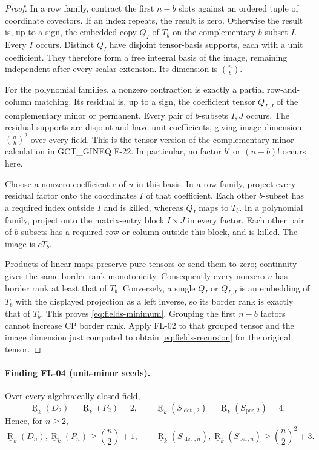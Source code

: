\begin{proof}
In a row family, contract the first $n-b$ slots against an ordered
tuple of coordinate covectors. If an index repeats, the result is
zero. Otherwise the result is, up to a sign, the embedded copy
$Q_I$ of $T_b$ on the complementary $b$-subset $I$. Every $I$
occurs. Distinct $Q_I$ have disjoint tensor-basis supports, each
with a unit coefficient. They therefore form a free integral basis
of the image, remaining independent after every scalar extension.
Its dimension is $\binom nb$.

For the polynomial families, a nonzero contraction is exactly a
partial row-and-column matching. Its residual is, up to a sign,
the coefficient tensor $Q_{I,J}$ of the complementary minor or
permanent. Every pair of $b$-subsets $I,J$ occurs. The residual
supports are disjoint and have unit coefficients, giving image
dimension $\binom nb^2$ over every field. This is the tensor version
of the complementary-minor calculation in GCT\_GINEQ F-22.
In particular, no factor $b!$ or $(n-b)!$ occurs here.

Choose a nonzero coefficient $c$ of $u$ in this basis. In a row
family, project every residual factor onto the coordinates $I$
of that coefficient. Each other $b$-subset has a required index
outside $I$ and is killed, whereas $Q_I$ maps to $T_b$.
In a polynomial family, project onto the matrix-entry block
$I\times J$ in every factor. Each other pair of $b$-subsets has
a required row or column outside this block, and is killed.
The image is $cT_b$.

Products of linear maps preserve pure tensors or send them to
zero; continuity gives the same border-rank monotonicity.
Consequently every nonzero $u$ has border rank at least that of
$T_b$. Conversely, a single $Q_I$ or $Q_{I,J}$ is an embedding of
$T_b$ with the displayed projection as a left inverse, so its
border rank is exactly that of $T_b$. This proves
\eqref{eq:fields-minimum}. Grouping the first $n-b$ factors
cannot increase CP border rank. Apply FL-02 to that grouped
tensor and the image dimension just computed to obtain
\eqref{eq:fields-recursion} for the original tensor.
\end{proof}

\paragraph{Finding FL-04 (unit-minor seeds).}
Over every algebraically closed field,
\[
 \underline{\operatorname R}_k(D_2)=
 \underline{\operatorname R}_k(P_2)=2,\qquad
 \underline{\operatorname R}_k(S_{\det,2})=
 \underline{\operatorname R}_k(S_{\mathrm{per},2})=4.
\]
Hence, for $n\geq2$,
\[
 \underline{\operatorname R}_k(D_n),
 \underline{\operatorname R}_k(P_n)\geq\binom n2+1,
 \qquad
 \underline{\operatorname R}_k(S_{\det,n}),
 \underline{\operatorname R}_k(S_{\mathrm{per},n})
       \geq\binom n2^2+3.
\]

